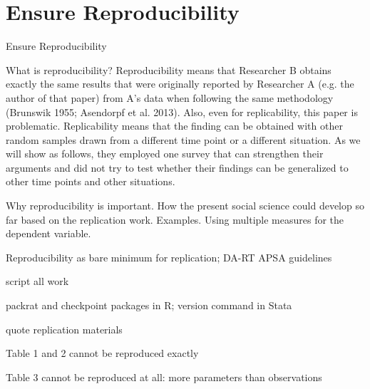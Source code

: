 
\section{Ensure Reproducibility}

Ensure Reproducibility

What is reproducibility? Reproducibility means that Researcher B obtains exactly the same results that were originally reported by Researcher A (e.g. the author of that paper) from A’s data when following the same methodology (Brunswik 1955; Asendorpf et al. 2013). 
Also, even for replicability, this paper is problematic. Replicability means that the finding can be obtained with other random samples drawn from a different time point or a different situation. As we will show as follows, they employed one survey that can strengthen their arguments and did not try to test whether their findings can be generalized to other time points and other situations. 

Why reproducibility is important.
How the present social science could develop so far based on the replication work. Examples.
Using multiple measures for the dependent variable. 

Reproducibility as bare minimum for replication; DA-RT APSA guidelines

script all work

packrat and checkpoint packages in R; version command in Stata

quote \citet{Newman2015} replication materials

Table 1 and 2 cannot be reproduced exactly

Table 3 cannot be reproduced at all: more parameters than observations
